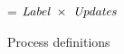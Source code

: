 \begin{figure}
\begin{minipage}[t]{0.4\textwidth}
\begin{tabbing}
\Next \> = \> $\textit{Label}~\times~\textit{Updates}$ 
\end{tabbing}
\end{minipage}
\caption{Process definitions}
\label{fig:Process:Def}
\end{figure}

